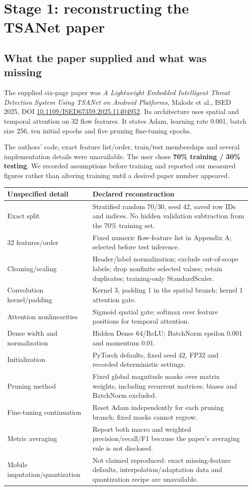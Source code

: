 \documentclass[11pt,a4paper,oneside]{report}
\begin{document}
\chapter{Stage 1: reconstructing the TSANet paper}
\section{What the paper supplied and what was missing}
The supplied six-page paper was \emph{A Lightweight Embedded Intelligent Threat Detection System Using TSANet on Android Platforms}, Malode et al., ISED 2025, DOI \href{https://doi.org/10.1109/ISED67359.2025.11404952}{10.1109/ISED67359.2025.11404952}. Its architecture uses spatial and temporal attention on 32 flow features. It states Adam, learning rate 0.001, batch size 256, ten initial epochs and five pruning fine-tuning epochs.

The authors' code, exact feature list/order, train/test memberships and several implementation details were unavailable. The user chose \textbf{70\% training / 30\% testing}. We recorded assumptions before training and reported our measured figures rather than altering training until a desired paper number appeared.
\begin{longtable}{p{}p{}}
\toprule Unspecified detail & Declared reconstruction\\\midrule\endhead
Exact split & Stratified random 70/30, seed 42, saved row IDs and indices. No hidden validation subtraction from the 70\% training set.\\
32 features/order & Fixed numeric flow-feature list in Appendix A; selected before test inference.\\
Cleaning/scaling & Header/label normalization; exclude out-of-scope labels; drop nonfinite selected values; retain duplicates; training-only StandardScaler.\\
Convolution kernel/padding & Kernel 3, padding 1 in the spatial branch; kernel 1 attention gate.\\
Attention nonlinearities & Sigmoid spatial gate; softmax over feature positions for temporal attention.\\
Dense width and normalization & Hidden Dense 64/ReLU; BatchNorm epsilon 0.001 and momentum 0.01.\\
Initialization & PyTorch defaults, fixed seed 42, FP32 and recorded deterministic settings.\\
Pruning method & Fixed global magnitude masks over matrix weights, including recurrent matrices; biases and BatchNorm excluded.\\
Fine-tuning continuation & Reset Adam independently for each pruning branch; fixed masks cannot regrow.\\
Metric averaging & Report both macro and weighted precision/recall/F1 because the paper's averaging rule is not disclosed.\\
Mobile imputation/quantization & Not claimed reproduced: exact missing-feature defaults, interpolation/adaptation data and quantization recipe are unavailable.\\
\bottomrule
\end{longtable}
\end{document}
